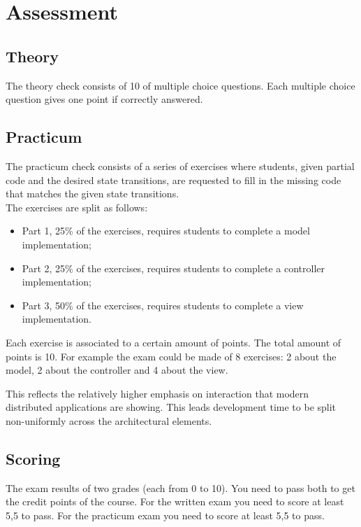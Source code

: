 \section{Assessment}

\subsection*{Theory}
The theory check consists of 10 of multiple choice questions. Each multiple choice question gives one point if correctly answered. 
 
\subsection*{Practicum}
The practicum check consists of a series of exercises where students, given partial
code and the desired state transitions, are requested to fill in the
missing code that matches the given state transitions.
\\
The exercises are split as follows: 
\begin{itemize}
\item Part 1, 25\% of the exercises, requires students to complete a model implementation; 
\item Part 2, 25\% of the exercises, requires students to complete a controller implementation; 
\item Part 3, 50\% of the exercises, requires students to complete a view implementation.
\end{itemize}
Each exercise is associated to a certain amount of points. The total amount of points is 10.
For example the exam could be made of 8 exercises: 2 about the model, 2
about the controller and 4 about the view.

This reflects the relatively higher emphasis on interaction that modern
distributed applications are showing. This leads development time to be
split non-uniformly across the architectural elements.

\subsection*{Scoring}

The exam results of two grades (each from 0 to 10). You need to pass both to get the credit points of the course.
For the written exam you need to score at least 5,5 to pass. 
For the practicum exam you need to score at least 5,5 to pass.  




